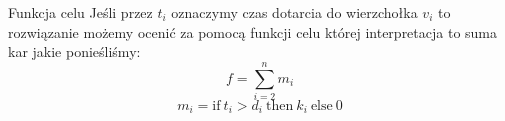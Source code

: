 \begin{frame}
	\begin{block}{Funkcja celu}
		Jeśli przez $t_i$ oznaczymy czas dotarcia do wierzchołka $v_i$ to rozwiązanie możemy ocenić za pomocą funkcji celu której interpretacja to suma kar jakie ponieśliśmy:
\begin{equation}
	f = \sum\limits_{i=2}^{n} m_i
\end{equation}
\begin{equation}
m_i = \text{if} \ t_i > d_i \ \text{then} \ k_i \ \text{else} \ 0
\end{equation}
	\end{block}


\end{frame}
